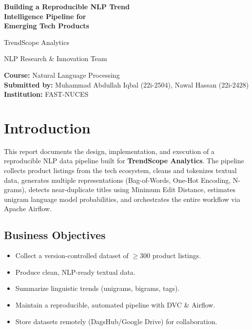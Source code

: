 \documentclass[12pt,a4paper]{article}
\begin{document}
\begin{titlepage}
  \centering
  \vspace*{2cm}
  {\Huge\bfseries Building a Reproducible NLP Trend\\Intelligence Pipeline for\\Emerging Tech Products\par}
  \vspace{1.5cm}
  {\Large TrendScope Analytics\par}
  \vspace{1cm}
  {\large NLP Research \& Innovation Team\par}
  \vspace{2cm}
  {\large
    \textbf{Course:} Natural Language Processing\\[0.3cm]
    \textbf{Submitted by:} Muhammad Abdullah Iqbal (22i-2504), Nawal Hassan (22i-2428)\\[0.3cm]
    \textbf{Institution:} FAST-NUCES\\[0.3cm]
  }
  \vspace{2cm}

\end{titlepage}

\tableofcontents
\newpage

\section{Introduction}

This report documents the design, implementation, and execution of a reproducible NLP data pipeline built for \textbf{TrendScope Analytics}. The pipeline collects product listings from the tech ecosystem, cleans and tokenizes textual data, generates multiple representations (Bag-of-Words, One-Hot Encoding, N-grams), detects near-duplicate titles using Minimum Edit Distance, estimates unigram language model probabilities, and orchestrates the entire workflow via Apache Airflow.

\subsection{Business Objectives}
\begin{itemize}
  \item Collect a version-controlled dataset of $\geq 300$ product listings.
  \item Produce clean, NLP-ready textual data.
  \item Summarize linguistic trends (unigrams, bigrams, tags).
  \item Maintain a reproducible, automated pipeline with DVC \& Airflow.
  \item Store datasets remotely (DagsHub/Google Drive) for collaboration.
\end{itemize}
\end{document}
